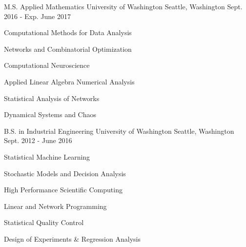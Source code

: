 

\begin{cventries}

  \cventry
    {M.S. Applied Mathematics} %
    {University of Washington} %
    {Seattle, Washington} %
    {Sept. 2016 - Exp. June 2017} %
    {
      \begin{cvitems} %
        \vspace*{-3mm}
        \begin{multicols}{3}
          \item {Computational Methods for Data Analysis}        
          \item {Networks and Combinatorial Optimization}
          \item {Computational Neuroscience}
          \item {Applied Linear Algebra Numerical Analysis}
          \item {Statistical Analysis of Networks}
          \item {Dynamical Systems and Chaos}
        \end{multicols}
      \end{cvitems}
      \vspace*{-2mm}
    }
  \cventry
    {B.S. in Industrial Engineering} %
    {University of Washington} %
    {Seattle, Washington} %
    {Sept. 2012 - June 2016} %
    {
      \begin{cvitems} %
        \vspace*{-3mm}
        \begin{multicols}{3}
          \item {Statistical Machine Learning}
          \item {Stochastic Models and Decision Analysis}          
          \item {High Performance Scientific Computing}
          \item {Linear and Network Programming}
          \item {Statistical Quality Control}
          \item {Design of Experiments \& Regression Analysis}
        \end{multicols}
      \end{cvitems}
      \vspace*{-2mm}
    }


\end{cventries}
